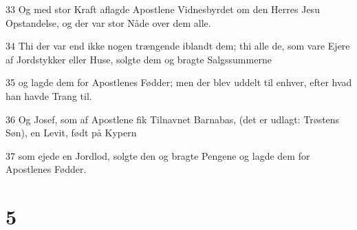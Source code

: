 \par 33 Og med stor Kraft aflagde Apostlene Vidnesbyrdet om den Herres Jesu Opstandelse, og der var stor Nåde over dem alle.
\par 34 Thi der var end ikke nogen trængende iblandt dem; thi alle de, som vare Ejere af Jordstykker eller Huse, solgte dem og bragte Salgssummerne
\par 35 og lagde dem for Apostlenes Fødder; men der blev uddelt til enhver, efter hvad han havde Trang til.
\par 36 Og Josef, som af Apostlene fik Tilnavnet Barnabas, (det er udlagt: Trøstens Søn), en Levit, født på Kypern
\par 37 som ejede en Jordlod, solgte den og bragte Pengene og lagde dem for Apostlenes Fødder.

\chapter{5}

